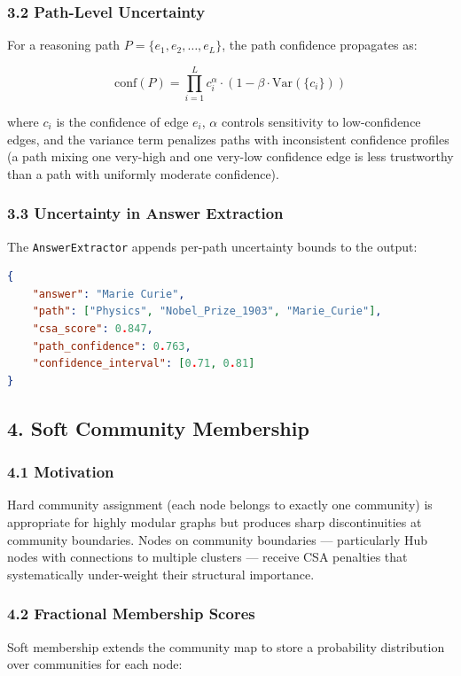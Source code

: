 \subsubsection*{3.2 Path-Level Uncertainty}
For a reasoning path $P = \{e_1, e_2, \ldots, e_L\}$, the path confidence propagates as:

$$\text{conf}(P) = \prod_{i=1}^{L} c_i^{\alpha} \cdot \left(1 - \beta \cdot \text{Var}(\{c_i\})\right)$$

where $c_i$ is the confidence of edge $e_i$, $\alpha$ controls sensitivity to low-confidence edges, and the variance term penalizes paths with inconsistent confidence profiles (a path mixing one very-high and one very-low confidence edge is less trustworthy than a path with uniformly moderate confidence).

\subsubsection*{3.3 Uncertainty in Answer Extraction}
The \texttt{AnswerExtractor} appends per-path uncertainty bounds to the output:

\begin{lstlisting}[language=Json]
{
    "answer": "Marie Curie",
    "path": ["Physics", "Nobel_Prize_1903", "Marie_Curie"],
    "csa_score": 0.847,
    "path_confidence": 0.763,
    "confidence_interval": [0.71, 0.81]
}
\end{lstlisting}

\subsection*{4. Soft Community Membership}

\subsubsection*{4.1 Motivation}
Hard community assignment (each node belongs to exactly one community) is appropriate for highly modular graphs but produces sharp discontinuities at community boundaries. Nodes on community boundaries --- particularly Hub nodes with connections to multiple clusters --- receive CSA penalties that systematically under-weight their structural importance.

\subsubsection*{4.2 Fractional Membership Scores}
Soft membership extends the community map to store a probability distribution over communities for each node:

